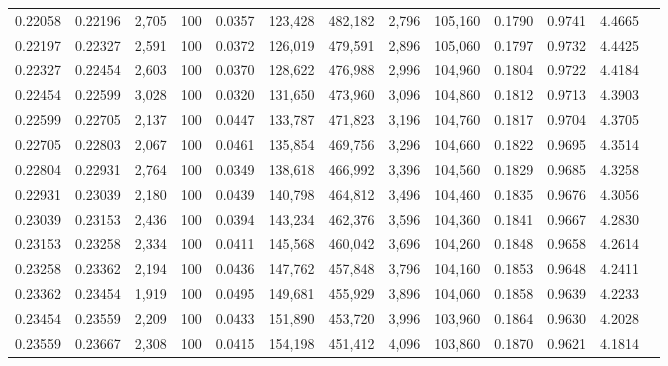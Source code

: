 \begin{tabular}{rrrrrrrrrrrrr}
0.22058 & 0.22196 &  2,705 & 100 &                                     0.0357 & 123,428 & 482,182 &   2,796 & 105,160 & 0.1790 & 0.9741 & 4.4665 \\
0.22197 & 0.22327 &  2,591 & 100 &                                     0.0372 & 126,019 & 479,591 &   2,896 & 105,060 & 0.1797 & 0.9732 & 4.4425 \\
0.22327 & 0.22454 &  2,603 & 100 &                                     0.0370 & 128,622 & 476,988 &   2,996 & 104,960 & 0.1804 & 0.9722 & 4.4184 \\
0.22454 & 0.22599 &  3,028 & 100 &                                     0.0320 & 131,650 & 473,960 &   3,096 & 104,860 & 0.1812 & 0.9713 & 4.3903 \\
0.22599 & 0.22705 &  2,137 & 100 &                                     0.0447 & 133,787 & 471,823 &   3,196 & 104,760 & 0.1817 & 0.9704 & 4.3705 \\
0.22705 & 0.22803 &  2,067 & 100 &                                     0.0461 & 135,854 & 469,756 &   3,296 & 104,660 & 0.1822 & 0.9695 & 4.3514 \\
0.22804 & 0.22931 &  2,764 & 100 &                                     0.0349 & 138,618 & 466,992 &   3,396 & 104,560 & 0.1829 & 0.9685 & 4.3258 \\
0.22931 & 0.23039 &  2,180 & 100 &                                     0.0439 & 140,798 & 464,812 &   3,496 & 104,460 & 0.1835 & 0.9676 & 4.3056 \\
0.23039 & 0.23153 &  2,436 & 100 &                                     0.0394 & 143,234 & 462,376 &   3,596 & 104,360 & 0.1841 & 0.9667 & 4.2830 \\
0.23153 & 0.23258 &  2,334 & 100 &                                     0.0411 & 145,568 & 460,042 &   3,696 & 104,260 & 0.1848 & 0.9658 & 4.2614 \\
0.23258 & 0.23362 &  2,194 & 100 &                                     0.0436 & 147,762 & 457,848 &   3,796 & 104,160 & 0.1853 & 0.9648 & 4.2411 \\
0.23362 & 0.23454 &  1,919 & 100 &                                     0.0495 & 149,681 & 455,929 &   3,896 & 104,060 & 0.1858 & 0.9639 & 4.2233 \\
0.23454 & 0.23559 &  2,209 & 100 &                                     0.0433 & 151,890 & 453,720 &   3,996 & 103,960 & 0.1864 & 0.9630 & 4.2028 \\
0.23559 & 0.23667 &  2,308 & 100 &                                     0.0415 & 154,198 & 451,412 &   4,096 & 103,860 & 0.1870 & 0.9621 & 4.1814 \\

\end{tabular}
